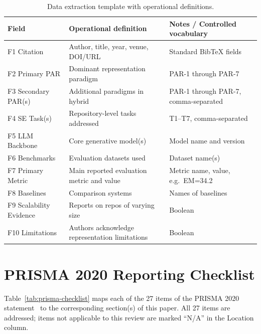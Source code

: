 \begin{table}[h]
\caption{Data extraction template with operational definitions.}
\label{tab:extraction-template}
\small
\begin{tabular}{lp{4cm}p{5cm}}
\toprule
\textbf{Field} & \textbf{Operational definition} & \textbf{Notes / Controlled vocabulary} \\
\midrule
F1 Citation & Author, title, year, venue, DOI/URL & Standard BibTeX fields \\
F2 Primary PAR & Dominant representation paradigm & PAR-1 through PAR-7 \\
F3 Secondary PAR(s) & Additional paradigms in hybrid & PAR-1 through PAR-7, comma-separated \\
F4 SE Task(s) & Repository-level tasks addressed & T1--T7, comma-separated \\
F5 LLM Backbone & Core generative model(s) & Model name and version \\
F6 Benchmarks & Evaluation datasets used & Dataset name(s) \\
F7 Primary Metric & Main reported evaluation metric and value & Metric name, value, e.g.\ EM=34.2 \\
F8 Baselines & Comparison systems & Names of baselines \\
F9 Scalability Evidence & Reports on repos of varying size & Boolean \\
F10 Limitations & Authors acknowledge representation limitations & Boolean \\
\bottomrule
\end{tabular}
\end{table}

\section{PRISMA 2020 Reporting Checklist}
\label{appendix:prisma-checklist}

Table~\ref{tab:prisma-checklist} maps each of the 27 items of the PRISMA 2020
statement~\cite{page2021prisma} to the corresponding section(s) of this paper.
All 27 items are addressed; items not applicable to this review are marked ``N/A''
in the Location column.

